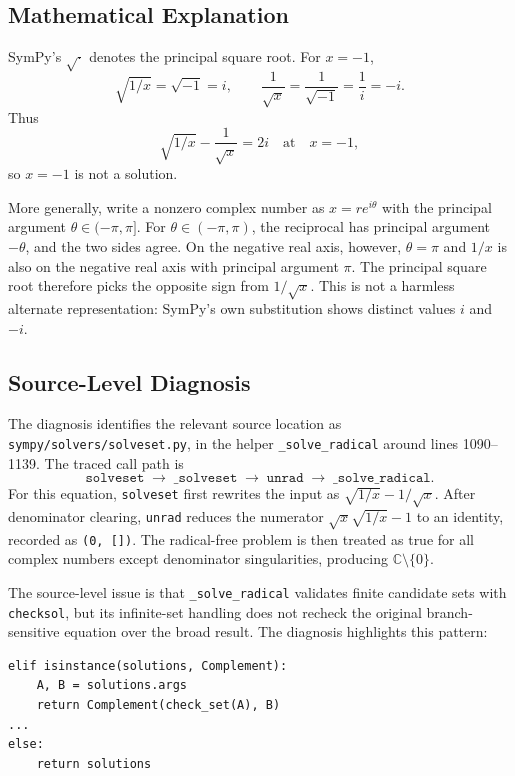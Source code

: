\documentclass[11pt]{article}
\begin{document}
\subsection{Mathematical Explanation}

SymPy's \(\sqrt{\cdot}\) denotes the principal square root. For \(x=-1\),
\[
    \sqrt{1/x} = \sqrt{-1} = i,
    \qquad
    \frac{1}{\sqrt{x}} = \frac{1}{\sqrt{-1}} = \frac{1}{i} = -i.
\]
Thus
\[
    \sqrt{1/x} - \frac{1}{\sqrt{x}} = 2i
    \quad\text{at}\quad x=-1,
\]
so \(x=-1\) is not a solution.

More generally, write a nonzero complex number as \(x = r e^{i\theta}\) with the principal argument \(\theta \in (-\pi,\pi]\). For \(\theta \in (-\pi,\pi)\), the reciprocal has principal argument \(-\theta\), and the two sides agree. On the negative real axis, however, \(\theta=\pi\) and \(1/x\) is also on the negative real axis with principal argument \(\pi\). The principal square root therefore picks the opposite sign from \(1/\sqrt{x}\). This is not a harmless alternate representation: SymPy's own substitution shows distinct values \(i\) and \(-i\).

\subsection{Source-Level Diagnosis}

The diagnosis identifies the relevant source location as \nolinkurl{sympy/solvers/solveset.py}, in the helper \texttt{\_solve\_radical} around lines 1090--1139. The traced call path is
\[
    \texttt{solveset}
    \;\to\;
    \texttt{\_solveset}
    \;\to\;
    \texttt{unrad}
    \;\to\;
    \texttt{\_solve\_radical}.
\]
For this equation, \texttt{solveset} first rewrites the input as \(\sqrt{1/x}-1/\sqrt{x}\). After denominator clearing, \texttt{unrad} reduces the numerator \(\sqrt{x}\sqrt{1/x}-1\) to an identity, recorded as \texttt{(0, [])}. The radical-free problem is then treated as true for all complex numbers except denominator singularities, producing \(\mathbb{C}\setminus\{0\}\).

The source-level issue is that \texttt{\_solve\_radical} validates finite candidate sets with \texttt{checksol}, but its infinite-set handling does not recheck the original branch-sensitive equation over the broad result. The diagnosis highlights this pattern:

\begin{lstlisting}[style=bugpython]
elif isinstance(solutions, Complement):
    A, B = solutions.args
    return Complement(check_set(A), B)
...
else:
    return solutions
\end{lstlisting}
\end{document}
